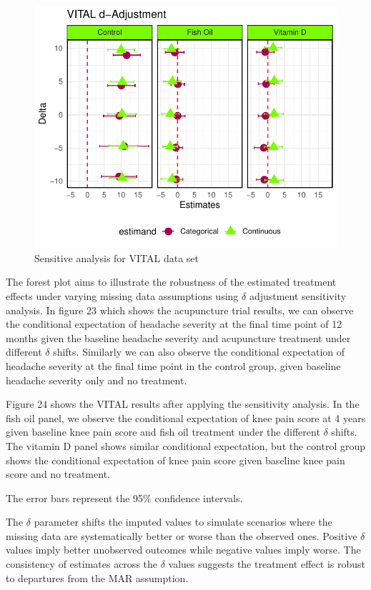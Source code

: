 \documentclass{article}
\newcommand{\pandocbounded}[1]{#1}
\begin{document}
\begin{figure}
\centering
\pandocbounded{\includegraphics[keepaspectratio]{Final_Report_files/figure-latex/unnamed-chunk-34-1.pdf}}
\caption{Sensitive analysis for VITAL data set}
\end{figure}

The forest plot aims to illustrate the robustness of the estimated
treatment effects under varying missing data assumptions using
\(\delta\) adjustment sensitivity analysis. In figure 23 which shows the
acupuncture trial results, we can observe the conditional expectation of
headache severity at the final time point of 12 months given the
baseline headache severity and acupuncture treatment under different
\(\delta\) shifts. Similarly we can also observe the conditional
expectation of headache severity at the final time point in the control
group, given baseline headache severity only and no treatment.

Figure 24 shows the VITAL results after applying the sensitivity
analysis. In the fish oil panel, we observe the conditional expectation
of knee pain score at 4 years given baseline knee pain score and fish
oil treatment under the different \(\delta\) shifts. The vitamin D panel
shows similar conditional expectation, but the control group shows the
conditional expectation of knee pain score given baseline knee pain
score and no treatment.

The error bars represent the 95\% confidence intervals.

The \(\delta\) parameter shifts the imputed values to simulate scenarios
where the missing data are systematically better or worse than the
observed ones. Positive \(\delta\) values imply better unobserved
outcomes while negative values imply worse. The consistency of estimates
across the \(\delta\) values suggests the treatment effect is robust to
departures from the MAR assumption.
\end{document}
